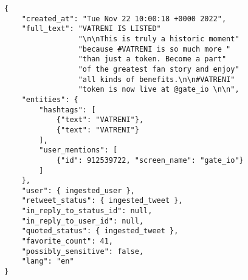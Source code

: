 \begin{code}
\label{subsubsec:sdlc-analysis-data-source:ingest-tweet}
\begin{verbatim}
{
    "created_at": "Tue Nov 22 10:00:18 +0000 2022",
    "full_text": "VATRENI IS LISTED"
                 "\n\nThis is truly a historic moment"
                 "because #VATRENI is so much more "
                 "than just a token. Become a part"
                 "of the greatest fan story and enjoy"
                 "all kinds of benefits.\n\n#VATRENI"
                 "token is now live at @gate_io \n\n",
    "entities": {
        "hashtags": [
            {"text": "VATRENI"},
            {"text": "VATRENI"}
        ],
        "user_mentions": [
            {"id": 912539722, "screen_name": "gate_io"}
        ]
    },
    "user": { ingested_user },
    "retweet_status": { ingested_tweet },
    "in_reply_to_status_id": null,
    "in_reply_to_user_id": null,
    "quoted_status": { ingested_tweet },
    "favorite_count": 41,
    "possibly_sensitive": false,
    "lang": "en"
}
\end{verbatim}
\end{code}

